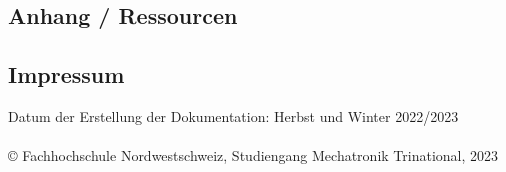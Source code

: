 \begin{appendix} %
\section{Anhang / Ressourcen}

\subsection{Impressum}
Datum der Erstellung der Dokumentation: Herbst und Winter 2022/2023\\
\\
© Fachhochschule Nordwestschweiz, Studiengang Mechatronik Trinational, 2023

{\sloppypar
\printbibliography[heading=bibintoc, title=Quellenverzeichnis]
}

\listoffigures
\listoftables

\end{appendix}
